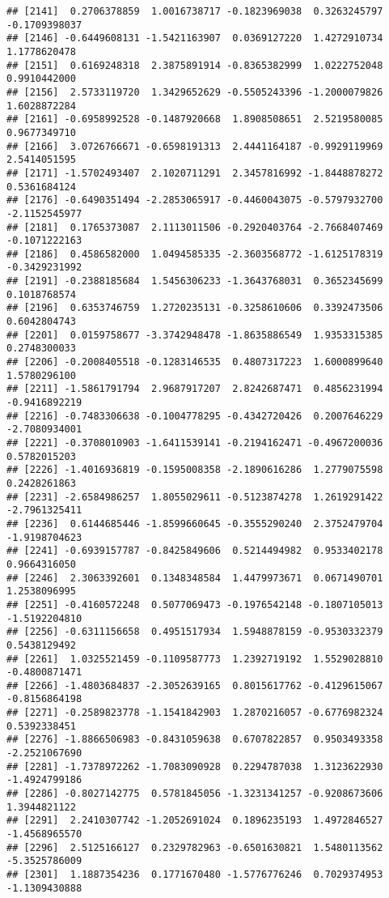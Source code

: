 \documentclass[
]{article}
\begin{document}
\begin{verbatim}
## [2141]  0.2706378859  1.0016738717 -0.1823969038  0.3263245797 -0.1709398037
## [2146] -0.6449608131 -1.5421163907  0.0369127220  1.4272910734  1.1778620478
## [2151]  0.6169248318  2.3875891914 -0.8365382999  1.0222752048  0.9910442000
## [2156]  2.5733119720  1.3429652629 -0.5505243396 -1.2000079826  1.6028872284
## [2161] -0.6958992528 -0.1487920668  1.8908508651  2.5219580085  0.9677349710
## [2166]  3.0726766671 -0.6598191313  2.4441164187 -0.9929119969  2.5414051595
## [2171] -1.5702493407  2.1020711291  2.3457816992 -1.8448878272  0.5361684124
## [2176] -0.6490351494 -2.2853065917 -0.4460043075 -0.5797932700 -2.1152545977
## [2181]  0.1765373087  2.1113011506 -0.2920403764 -2.7668407469 -0.1071222163
## [2186]  0.4586582000  1.0494585335 -2.3603568772 -1.6125178319 -0.3429231992
## [2191] -0.2388185684  1.5456306233 -1.3643768031  0.3652345699  0.1018768574
## [2196]  0.6353746759  1.2720235131 -0.3258610606  0.3392473506  0.6042804743
## [2201]  0.0159758677 -3.3742948478 -1.8635886549  1.9353315385  0.2748300033
## [2206] -0.2008405518 -0.1283146535  0.4807317223  1.6000899640  1.5780296100
## [2211] -1.5861791794  2.9687917207  2.8242687471  0.4856231994 -0.9416892219
## [2216] -0.7483306638 -0.1004778295 -0.4342720426  0.2007646229 -2.7080934001
## [2221] -0.3708010903 -1.6411539141 -0.2194162471 -0.4967200036  0.5782015203
## [2226] -1.4016936819 -0.1595008358 -2.1890616286  1.2779075598  0.2428261863
## [2231] -2.6584986257  1.8055029611 -0.5123874278  1.2619291422 -2.7961325411
## [2236]  0.6144685446 -1.8599660645 -0.3555290240  2.3752479704 -1.9198704623
## [2241] -0.6939157787 -0.8425849606  0.5214494982  0.9533402178  0.9664316050
## [2246]  2.3063392601  0.1348348584  1.4479973671  0.0671490701  1.2538096995
## [2251] -0.4160572248  0.5077069473 -0.1976542148 -0.1807105013 -1.5192204810
## [2256] -0.6311156658  0.4951517934  1.5948878159 -0.9530332379  0.5438129492
## [2261]  1.0325521459 -0.1109587773  1.2392719192  1.5529028810 -0.4800871471
## [2266] -1.4803684837 -2.3052639165  0.8015617762 -0.4129615067 -0.8156864198
## [2271] -0.2589823778 -1.1541842903  1.2870216057 -0.6776982324  0.5392338451
## [2276] -1.8866506983 -0.8431059638  0.6707822857  0.9503493358 -2.2521067690
## [2281] -1.7378972262 -1.7083090928  0.2294787038  1.3123622930 -1.4924799186
## [2286] -0.8027142775  0.5781845056 -1.3231341257 -0.9208673606  1.3944821122
## [2291]  2.2410307742 -1.2052691024  0.1896235193  1.4972846527 -1.4568965570
## [2296]  2.5125166127  0.2329782963 -0.6501630821  1.5480113562 -5.3525786009
## [2301]  1.1887354236  0.1771670480 -1.5776776246  0.7029374953 -1.1309430888

\end{verbatim}
\end{document}
